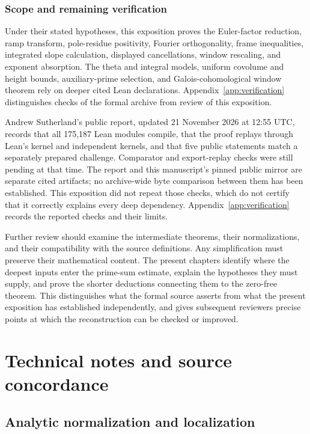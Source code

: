 \documentclass[11pt,openany,oneside]{scrbook}
\theoremstyle{definition}
\theoremstyle{remark}
\begin{document}
\section{Scope and remaining verification}
Under their stated hypotheses, this exposition proves the Euler-factor reduction, ramp transform, pole-residue positivity, Fourier orthogonality, frame inequalities, integrated slope calculation, displayed cancellations, window rescaling, and exponent absorption. The theta and integral models, uniform covolume and height bounds, auxiliary-prime selection, and Galois-cohomological window theorem rely on deeper cited Lean declarations. Appendix~\ref{app:verification} distinguishes checks of the formal archive from review of this exposition.

Andrew Sutherland's public report, updated 21 November 2026 at 12:55 UTC, records that all 175,187 Lean modules compile, that the proof replays through Lean's kernel and independent kernels, and that five public statements match a separately prepared challenge. Comparator and export-replay checks were still pending at that time. The report and this manuscript's pinned public mirror are separate cited artifacts; no archive-wide byte comparison between them has been established. This exposition did not repeat those checks, which do not certify that it correctly explains every deep dependency. Appendix~\ref{app:verification} records the reported checks and their limits.

Further review should examine the intermediate theorems, their normalizations, and their compatibility with the source definitions. Any simplification must preserve their mathematical content. The present chapters identify where the deepest inputs enter the prime-sum estimate, explain the hypotheses they must supply, and prove the shorter deductions connecting them to the zero-free theorem. This distinguishes what the formal source asserts from what the present exposition has established independently, and gives subsequent reviewers precise points at which the reconstruction can be checked or improved.

\appendix
\part{Technical notes and source concordance}

\chapter{Analytic normalization and localization}\label{app:analytic}
\end{document}
